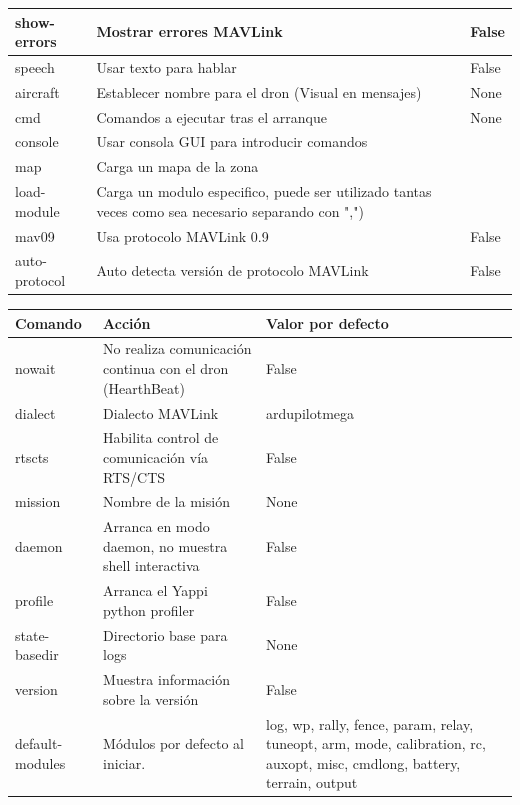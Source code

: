 \begin{center}
\begin{tabular}{ | l | p{7cm} | p{3.5cm} |}
    show-errors& Mostrar errores MAVLink& False \\ \hline
    speech& Usar texto para hablar & False \\ \hline
    aircraft& Establecer nombre para el dron (Visual en mensajes)& None \\ \hline
    cmd& Comandos a ejecutar tras el arranque & None  \\ \hline
    console& Usar consola GUI para introducir comandos &  \\ \hline
    map& Carga un mapa de la zona&  \\ \hline
    load-module& Carga un modulo especifico, puede ser utilizado tantas veces como sea necesario separando con ",")&  \\ \hline
    mav09& Usa protocolo MAVLink 0.9 & False \\ \hline
    auto-protocol&Auto detecta versión de protocolo MAVLink& False \\ \hline
  \end{tabular}
\end{center}
\begin{center}
  \label{tab:scriptArranqueComandos2}
  \begin{tabular}{ | l | p{7cm} | p{3.5cm} |}
  \hline
    \textbf{Comando} & \textbf{Acción} & \textbf{Valor por defecto} \\ \hline
    nowait&No realiza comunicación continua con el dron (HearthBeat) &  False\\ \hline
    dialect & Dialecto MAVLink& ardupilotmega \\ \hline
    rtscts& Habilita control de comunicación vía RTS/CTS&  False\\ \hline
    mission& Nombre de la misión& None \\ \hline
    daemon & Arranca en modo daemon, no muestra shell interactiva & False \\ \hline
    profile& Arranca el Yappi python profiler& False \\ \hline
    state-basedir& Directorio base para logs& None \\ \hline
    version& Muestra información sobre la versión& False \\ \hline
    default-modules& Módulos por defecto al iniciar.& log, wp, rally, fence, param, relay, tuneopt, arm, mode, calibration, rc, auxopt, misc, cmdlong, battery, terrain, output \\ \hline
  \end{tabular}
\end{center}

